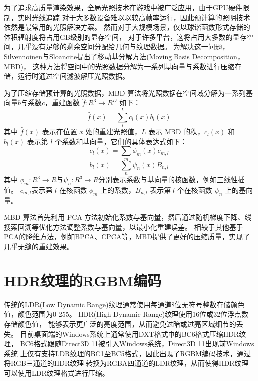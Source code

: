 为了追求高质量渲染效果，全局光照技术在游戏中被广泛应用，由于GPU硬件限制，实时光线追踪
对于大多数设备难以以较高帧率运行，因此预计算的照明技术依然是最常用的光照解决方案。
然而对于大规模场景，仅以球谐函数形式存储的体积辐射度将占用GB级别的显存空间\cite{silvennoinen2021moving}，
对于许多平台，这将占用大多数的显存空间，几乎没有足够的剩余空间分配给几何与纹理数据。
为解决这一问题，Silvennoinen与Sloancite\cite{silvennoinen2021moving}提出了移动基分解方法(Moving Basis Decomposition，MBD)，
这种方法将空间中的光照数据分解为一系列基向量与系数进行压缩存储，运行时通过空间滤波解压光照数据。

为了压缩存储预计算的光照数据，MBD 算法将光照数据在空间域分解为一系列基向量$b$与系数$c$，重建函数 $\hat{f}:R^3\to R^D$ 如下：
\begin{equation}
\hat f(x)=\sum_{l}^L c_{l} (x)b_{l}(x)
\end{equation}
其中 $\hat{f}(x)$ 表示在位置 $x$ 处的重建光照值，$L$ 表示 MBD 的秩，$c_l(x)$ 和 $b_l(x)$ 表示第 $l$ 个系数和基向量，它们的具体表达式如下：
\begin{equation}
c_{l}(x)=\sum_{m}\phi_{m} (x)c_{m,l}
\end{equation}
\begin{equation}
b_{l}(x)=\sum_{n}\psi_{n} (x)B_{n,l}
\end{equation}
其中 $\phi_{m}: R^{3} \rightarrow R$与$\psi_{n}: R^{3} \rightarrow R$分别表示系数与基向量的核函数，例如三线性插值。 $c_{m,l}$表示第 $l$ 在核函数 $\phi_m$ 上的系数，$B_{n,l}$ 表示第 $l$ 个在核函数 $\psi_n$ 上的基向量。

MBD\cite{silvennoinen2021moving} 算法首先利用 PCA 方法初始化系数与基向量，然后通过随机梯度下降、线搜索回溯等优化方法调整系数与基向量，以最小化重建误差。
相较于其他基于PCA的降维方法，例如BPCA\cite{nishino2005clustered}、CPCA\cite{sloan2003clustered}等，MBD\cite{silvennoinen2021moving}提供了更好的压缩质量，实现了几乎无缝的重建效果。

\section{HDR纹理的RGBM编码}

传统的LDR(Low Dynamic Range)纹理通常使用每通道8位无符号整数存储颜色值，颜色范围为0-255。
HDR(High Dynamic Range)纹理使用16位或32位浮点数存储颜色值，
能够表示更广泛的亮度范围，从而避免过暗或过亮区域细节的丢失。
目前桌面端的Windows系统上通常使用DXT格式中的BC6格式压缩HDR纹理，
BC6格式跟随Direct3D 11被引入Windows系统，Direct3D 11出现前Windows系统
上仅有支持LDR纹理的BC1至BC5格式，因此出现了RGBM编码技术，通过将RGB三通道的HDR纹理
转换为RGBA四通道的LDR纹理，从而使得HDR纹理可以使用LDR纹理格式进行压缩。

